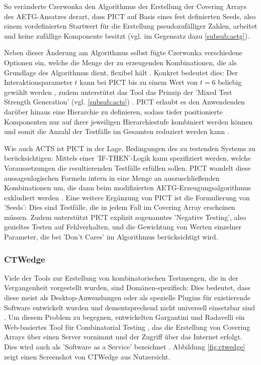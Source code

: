 So veränderte Czerwonka den Algorithmus der Erstellung der Covering Arrays des AETG-Ansatzes derart, dass PICT auf Basis eines fest definierten Seeds, also einem vordefinierten Startwert für die Erstellung pseudozufälliger Zahlen, arbeitet und keine zufällige Komponente besitzt (vgl. im Gegensatz dazu \autoref{subsub:aetg}). 

Neben dieser Änderung am Algorithmus selbst fügte Czerwonka verschiedene Optionen ein, welche die Menge der zu erzeugenden Kombinationen, die als Grundlage des Algorithmus dient, flexibel hält \cite{czerwonka2006pairwise}. Konkret bedeutet dies: Der Interaktionsparameter $t$ kann bei PICT bis zu einem Wert von $t = 6$ beliebig gewählt werden \cite{khalsa2014orchestrated}, zudem unterstützt das Tool das Prinzip der 'Mixed Test Strength Generation' (vgl. \autoref{subsub:acts}) \cite{czerwonka2006pairwise}. PICT erlaubt es den Anwendenden darüber hinaus eine Hierarchie zu definieren, sodass tiefer positionierte Komponenten nur auf ihrer jeweiligen Hierarchiestufe kombiniert werden können und somit die Anzahl der Testfälle im Gesamten reduziert werden kann \cite{czerwonka2006pairwise}. 

Wie auch ACTS ist PICT in der Lage, Bedingungen des zu testenden Systems zu berücksichtigen: Mittels einer 'IF-THEN'-Logik kann spezifiziert werden, welche Voraussetzungen die resultierenden Testfälle erfüllen sollen. PICT wandelt diese aussagenlogischen Formeln intern in eine Menge an auszuschließenden Kombinationen um, die dann beim modifizierten AETG-Erzeugungsalgorithmus exkludiert werden \cite{czerwonka2006pairwise}. Eine weitere Ergänzung von PICT ist die Formulierung von 'Seeds': Dies sind Testfälle, die in jedem Fall im Covering Array erscheinen müssen. Zudem unterstützt PICT explizit sogenanntes 'Negative Testing', also gezieltes Testen auf Fehlverhalten, und die Gewichtung von Werten einzelner Parameter, die bei 'Don't Cares' im Algorithmus berücksichtigt wird.

\subsubsection{CTWedge}\label{subsub:ctwedge}

Viele der Tools zur Erstellung von kombinatorischen Testmengen, die in der Vergangenheit vorgestellt wurden, sind Domänen-spezifisch: Dies bedeutet, dass diese meist als Desktop-Anwendungen oder als spezielle Plugins für existierende Software entwickelt wurden und dementsprechend nicht universell einsetzbar sind \cite{gargantini2018migrating}. Um diesem Problem zu begegnen, entwickelten Gargantini und Radavelli \cite{gargantini2018migrating} ein Web-basiertes Tool für Combinatorial Testing \cite{ctwedge}, das die Erstellung von Covering Arrays über einen Server vornimmt und der Zugriff über das Internet erfolgt. Dies wird auch als 'Software as a Service' bezeichnet \cite{gargantini2018migrating}. Abbildung \ref{fig:ctwedge} zeigt einen Screenshot von CTWedge aus Nutzersicht.


